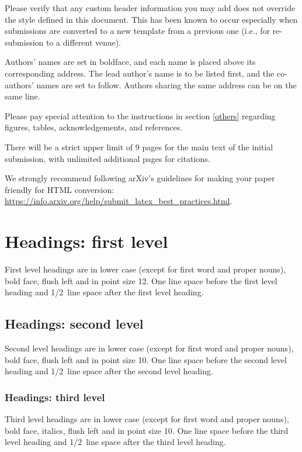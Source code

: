 \documentclass{article} %
\begin{document}
Please verify that any custom header information you may add does not override the style defined in this document. This has been known to occur especially when submissions are converted to a new template from a previous one (i.e., for re-submission to a different venue). 

Authors' names are
set in boldface, and each name is placed above its corresponding
address. The lead author's name is to be listed first, and
the co-authors' names are set to follow. Authors sharing the
same address can be on the same line.

Please pay special attention to the instructions in section \ref{others}
regarding figures, tables, acknowledgements, and references.


There will be a strict upper limit of 9 pages for the main text of the initial submission, with unlimited additional pages for citations. 

We strongly recommend following arXiv's guidelines for making your paper friendly for HTML conversion: \url{https://info.arxiv.org/help/submit_latex_best_practices.html}.


\section{Headings: first level}
\label{headings}

First level headings are in lower case (except for first word and proper nouns), bold face,
flush left and in point size 12. One line space before the first level
heading and 1/2~line space after the first level heading.

\subsection{Headings: second level}

Second level headings are in lower case (except for first word and proper nouns), bold face,
flush left and in point size 10. One line space before the second level
heading and 1/2~line space after the second level heading.

\subsubsection{Headings: third level}

Third level headings are in lower case (except for first word and proper nouns), bold face, italics, 
flush left and in point size 10. One line space before the third level
heading and 1/2~line space after the third level heading.
\end{document}
